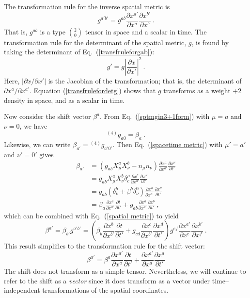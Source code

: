 \documentclass[letterpaper,nofootinbib,prd,amsmath,onecolumn]{revtex4-1}
\begin{document}
The transformation rule for the inverse spatial metric is 
\begin{equation}
g^{a'b'} = g^{ab}\frac{\partial x^{a'}}{\partial x^{a}}\frac{\partial x^{b'}}{\partial x^{b}}\label{spatial metric} \ .
\end{equation}
That is, $g^{ab}$ is a type $2 \choose 0$ tensor in space and a scalar in time. 
The transformation rule for the determinant of the spatial metric, $g$, is found by taking the determinant of Eq.~(\ref{transfruleforgab}):
\begin{equation}\label{transfrulefordetg}
g' = g\left| \frac{\partial x}{\partial x'} \right|^{2} \ .
\end{equation}
Here, $|\partial x/\partial x'|$ is the Jacobian of the transformation; that is, the determinant of $\partial x^a/\partial x^{a'}$. 
Equation (\ref{transfrulefordetg}) shows that $g$ transforms as a weight $+2$ density in space, and as a scalar 
in time. 
 
Now consider the  shift vector $\beta^{a}$. From Eq.~(\ref{sptmgin3+1form}) with $\mu = a$ and $\nu = 0$, we have
\begin{equation}
{}^{(4)}g_{a0} = \beta_{a}\label{shift} \ .
\end{equation}
Likewise, we can write $\beta_{a'} = {}^{(4)}g_{a'0'}$. 
Then Eq.~(\ref{spacetime metric}) with $\mu' = a'$ and $\nu' = 0'$ gives
\begin{align*}
\beta_{a'} & = (g_{ab}X^{a}_{\mu}X^{b}_{\nu} - n_{\mu}n_{\nu})\frac{\partial x^{\mu}}{\partial x^{a'}}\frac{\partial x^{\nu}}{\partial t'}\\
& = g_{ab}X^{a}_{\mu}X^{b}_{\nu}\delta_{c}^{\mu}\frac{\partial x^{c}}{\partial x^{a'}}\frac{\partial x^{\nu}}{\partial t'}\\
& = g_{ab}(\delta^{b}_{\nu} + \beta^{b}\delta^{0}_{\nu})\frac{\partial x^{a}}{\partial x^{a'}}\frac{\partial x^{\nu}}{\partial t'}\\
& = \beta_{a}\frac{\partial x^{a}}{\partial x^{a'}}\frac{\partial t}{\partial t'} + g_{ab}\frac{\partial x^{a}}{\partial x^{a'}}\frac{\partial x^{b}}{\partial t'} \ ,
\label{shift covector transform}
\end{align*}
which can be combined with Eq.~(\ref{spatial metric}) to yield
\begin{equation*}
\beta^{a'}  = \beta_{b'}g^{a'b'}
= \left(\beta_{b}\frac{\partial x^{b}}{\partial x^{b'}}\frac{\partial t}{\partial t'} 
+ g_{cd}\frac{\partial x^{c}}{\partial x^{b'}}\frac{\partial x^{d}}{\partial t'}\right)g^{ef}\frac{\partial x^{a'}}{\partial x^{e}}\frac{\partial x^{b'}}{\partial x^{f}} \ .
\end{equation*}
This result simplifies to the transformation rule for the shift vector: 
\begin{equation}
\beta^{a'} = \beta^{a}\frac{\partial x^{a'}}{\partial x^{a}}\frac{\partial t}{\partial t'} 
+ \frac{\partial x^{a'}}{\partial x^{a}}\frac{\partial x^{a}}{\partial t'}\label{shift vector transform}
\end{equation}
The shift does not transform as a simple tensor. Nevertheless, we will continue to refer to the shift as a {\em vector} since it 
does transform as a vector under time--independent transformations of the spatial coordinates. 
\end{document}
